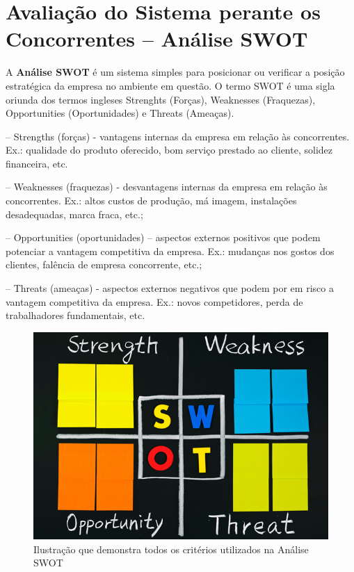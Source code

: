 \documentclass[graduacao,brazil]{ThesisPUC}
\begin{document}

\section{Avalia\c{c}\~{a}o do Sistema perante os Concorrentes -- An\'{a}lise SWOT}

A \textbf{An\'{a}lise SWOT} \cite{Fine09} \'{e} um sistema simples para posicionar ou verificar a
posi\c{c}\~{a}o estrat\'{e}gica da empresa no ambiente em quest\~{a}o. O termo SWOT \'{e} uma sigla
oriunda dos termos ingleses Strenghts (Forças), Weaknesses (Fraquezas), Opportunities (Oportunidades)
e Threats (Ameaças).

-- Strengths (forças) - vantagens internas da empresa em relação às concorrentes. Ex.:
qualidade do produto oferecido, bom serviço prestado ao cliente, solidez financeira, etc.

-- Weaknesses (fraquezas) - desvantagens internas da empresa em relação às concorrentes.
Ex.: altos custos de produção, má imagem, instalações desadequadas, marca fraca, etc.;

-- Opportunities (oportunidades) – aspectos externos positivos que podem potenciar a
vantagem competitiva da empresa. Ex.: mudanças nos gostos dos clientes, falência de
empresa concorrente, etc.;

-- Threats (ameaças) - aspectos externos negativos que podem por em risco a vantagem
competitiva da empresa. Ex.: novos competidores, perda de trabalhadores fundamentais,
etc.

\begin{figure}[H]
    \centering
    \includegraphics[width=\linewidth]{Imagens/swot.jpg}
    \caption{Ilustração que demonstra todos os critérios utilizados na Análise SWOT}
\end{figure}
\end{document}
